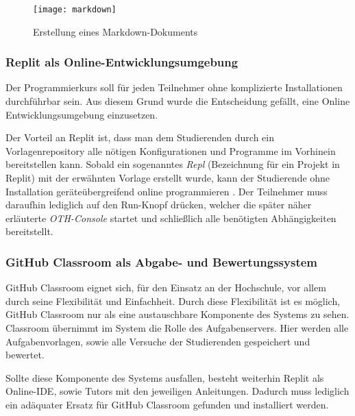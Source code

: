 \begin{figure}[H]
    \centering
    \texttt{[image: markdown]}
    \caption{Erstellung eines Markdown-Dokuments}
    \label{fig:markdown}
\end{figure}

\subsubsection{Replit als Online-Entwicklungsumgebung}
Der Programmierkurs soll für jeden Teilnehmer ohne komplizierte Installationen
durchführbar sein. Aus diesem Grund wurde die Entscheidung gefällt, eine
Online Entwicklungsumgebung einzusetzen.

Der Vorteil an Replit ist, dass man dem Studierenden durch ein
Vorlagenrepository alle nötigen Konfigurationen und Programme im Vorhinein
bereitstellen kann. Sobald ein sogenanntes \emph{Repl} (Bezeichnung für
ein Projekt in Replit) mit der erwähnten Vorlage erstellt wurde, kann der
Studierende ohne Installation geräteübergreifend online programmieren
\parencite{replit-import-from-github}. Der Teilnehmer muss daraufhin lediglich
auf den \glqq Run\grqq{}-Knopf drücken, welcher die später näher erläuterte
\emph{OTH-Console} startet und schließlich alle benötigten Abhängigkeiten
bereitstellt.

\subsubsection{GitHub Classroom als Abgabe- und Bewertungssystem}
GitHub Classroom eignet sich, für den Einsatz an der Hochschule, vor allem durch
seine Flexibilität und Einfachheit. Durch diese Flexibilität ist es möglich,
GitHub Classroom nur als eine austauschbare Komponente des Systems zu sehen.
Classroom übernimmt im System die Rolle des Aufgabenservers. Hier werden alle
Aufgabenvorlagen, sowie alle Versuche der Studierenden gespeichert und bewertet.

Sollte diese Komponente des Systems ausfallen, besteht weiterhin Replit als
Online-IDE, sowie Tutors mit den jeweiligen Anleitungen. Dadurch muss lediglich
ein adäquater Ersatz für GitHub Classroom gefunden und installiert werden.